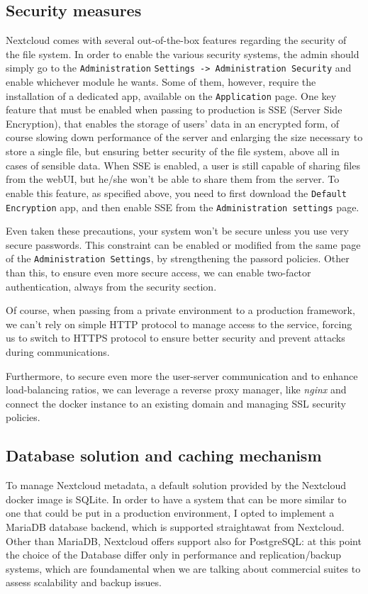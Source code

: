 \documentclass{article}
\begin{document}
	\subsection{Security measures}
	Nextcloud comes with several out-of-the-box features regarding the security of the file system. In order to enable the various security systems, the admin should simply go to the \verb|Administration| \verb|Settings -> Administration Security| and enable whichever module he wants. Some of them, however, require the installation of a dedicated app, available on the \verb|Application| page. One key feature that must be enabled when passing to production is SSE (Server Side Encryption), that enables the storage of users' data in an encrypted form, of course slowing down performance of the server and enlarging the size necessary to store a single file, but ensuring better security of the file system, above all in cases of sensible data. When SSE is enabled, a user is still capable of sharing files from the webUI, but he/she won't be able to share them from the server.
	To enable this feature, as specified above, you need to first download the \verb|Default Encryption| app, and then enable SSE from the \verb|Administration settings| page.
	
	Even taken these precautions, your system won't be secure unless you use very secure passwords. This constraint can be enabled or modified from the same page of the \verb|Administration Settings|, by strengthening the passord policies. Other than this, to ensure even more secure access, we can enable two-factor authentication, always from the security section.
	
	Of course, when passing from a private environment to a production framework, we can't rely on simple HTTP protocol to manage access to the service, forcing us to switch to HTTPS protocol to ensure better security and prevent attacks during communications.
	
	Furthermore, to secure even more the user-server communication and to enhance load-balancing ratios, we can leverage a reverse proxy manager, like \textit{nginx} and connect the docker instance to an existing domain and managing SSL security policies.
		
	\subsection{Database solution and caching mechanism}
	
	To manage Nextcloud metadata, a default solution provided by the Nextcloud docker image is SQLite. In order to have a system that can be more similar to one that could be put in a production environment, I opted to implement a MariaDB database backend, which is supported straightawat from Nextcloud. Other than MariaDB, Nextcloud offers support also for PostgreSQL: at this point the choice of the Database differ only in performance and replication/backup systems, which are foundamental when we are talking about commercial suites to assess scalability and backup issues.
	
\end{document}
